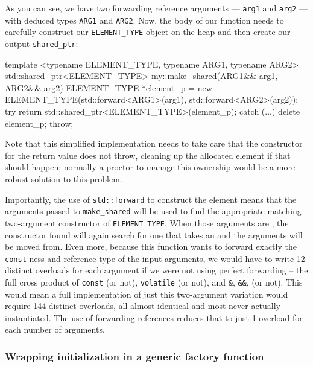\noindent As you can see, we have two forwarding reference arguments ---
\lstinline!arg1! and \lstinline!arg2! --- with deduced types \lstinline!ARG1! and
\lstinline!ARG2!. Now, the body of our function needs to carefully
construct our \lstinline!ELEMENT_TYPE! object on the heap and then create
our output \lstinline!shared_ptr!:

\begin{emcppslisting}[emcppsbatch=e9]
template <typename ELEMENT_TYPE, typename ARG1, typename ARG2>
std::shared_ptr<ELEMENT_TYPE> my::make_shared(ARG1&& arg1, ARG2&& arg2)
{
    ELEMENT_TYPE *element_p = new ELEMENT_TYPE(std::forward<ARG1>(arg1),
                                               std::forward<ARG2>(arg2));
    try
    {
        return std::shared_ptr<ELEMENT_TYPE>(element_p);
    }
    catch (...)
    {
        delete element_p;
        throw;
    }
}
\end{emcppslisting}

\noindent Note that this simplified implementation needs to take care that the
constructor for the return value does not throw, cleaning up the
allocated element if that should happen; normally a 
proctor to manage this ownership would be a more robust solution to this
problem.

Importantly, the use of \lstinline!std::forward! to construct the element
means that the arguments passed to \lstinline!make_shared! will be used to
find the appropriate matching two-argument constructor of
\lstinline!ELEMENT_TYPE!. When those arguments are , the
constructor found will again search for one that takes an 
and the arguments will be moved from. Even more, because this function
wants to forward exactly the \lstinline!const!-ness and reference type of
the input arguments, we would have to write 12 distinct overloads for
each argument if we were not using perfect forwarding -- the full cross
product of \lstinline!const! (or not), \lstinline!volatile! (or not), and
\lstinline!&!, \lstinline!&&!, (or not). This would mean a full
implementation of just this two-argument variation would require 144
distinct overloads, all almost identical and most never actually
instantiated. The use of forwarding references reduces that to just 1
overload for each number of arguments.

\subsubsection[Wrapping initialization in a generic factory function]{Wrapping initialization in a generic factory function}\label{wrapping-initialization-in-a-generic-factory-function}

